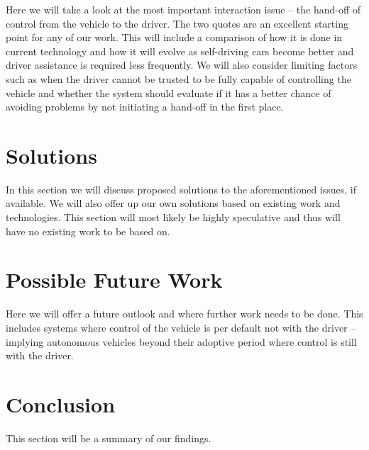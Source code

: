 \documentclass{acm_proc_article-sp}
\begin{document}
Here we will take a look at the most important interaction issue – the hand-off of control from the vehicle to the driver.
The two quotes are an excellent starting point for any of our work.
This will include a comparison of how it is done in current technology and how it will evolve as self-driving cars become better and driver assistance is required less frequently.
We will also consider limiting factors such as when the driver cannot be trusted to be fully capable of controlling the vehicle and whether the system should evaluate if it has a better chance of avoiding problems by not initiating a hand-off in the first place.

\section{Solutions}
\label{solutions}

In this section we will discuss proposed solutions to the aforementioned issues, if available.
We will also offer up our own solutions based on existing work and technologies.
This section will most likely be highly speculative and thus will have no existing work to be based on.

\section{Possible Future Work}

Here we will offer a future outlook and where further work needs to be done.
This includes systems where control of the vehicle is per default not with the driver – implying autonomous vehicles beyond their adoptive period where control is still with the driver.

\section{Conclusion}

This section will be a summary of our findings.


  

\balancecolumns
\end{document}
